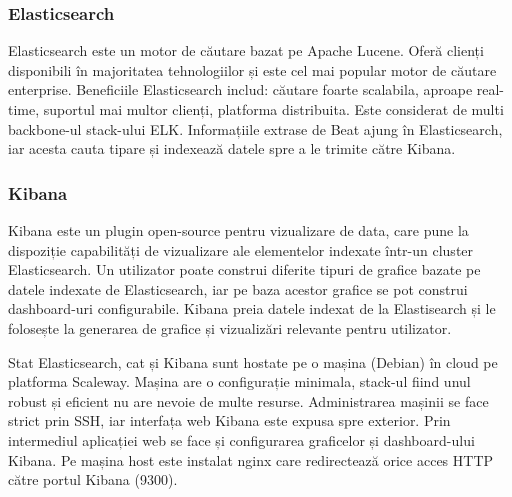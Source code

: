 \documentclass[a4paper, 12pt, twoside]{report}
\begin{document}
			\subsubsection{Elasticsearch}
Elasticsearch este un motor de căutare bazat pe Apache Lucene. Oferă clienți disponibili în majoritatea tehnologiilor și este cel mai popular motor de căutare enterprise. Beneficiile Elasticsearch includ: căutare foarte scalabila, aproape real-time, suportul mai multor clienți, platforma distribuita. Este considerat de multi backbone-ul stack-ului ELK. Informațiile extrase de Beat ajung în Elasticsearch, iar acesta cauta tipare și indexează datele spre a le trimite către Kibana.


			\subsubsection{Kibana}
Kibana este un plugin open-source pentru vizualizare de data, care pune la dispoziție capabilități de vizualizare ale elementelor indexate într-un cluster Elasticsearch. Un utilizator poate construi diferite tipuri de grafice bazate pe datele indexate de Elasticsearch, iar pe baza acestor grafice se pot construi dashboard-uri configurabile. Kibana preia datele indexat de la Elastisearch și le folosește la generarea de grafice și vizualizări relevante pentru utilizator.

Stat Elasticsearch, cat și Kibana sunt hostate pe o mașina (Debian) în cloud pe platforma Scaleway. Mașina are o configurație minimala, stack-ul fiind unul robust și eficient nu are nevoie de multe resurse. Administrarea mașinii se face strict prin SSH, iar interfața web Kibana este expusa spre exterior. Prin intermediul aplicației web se face și configurarea graficelor și dashboard-ului Kibana. Pe mașina host este instalat nginx care redirectează orice acces HTTP către portul Kibana (9300).
\end{document}
